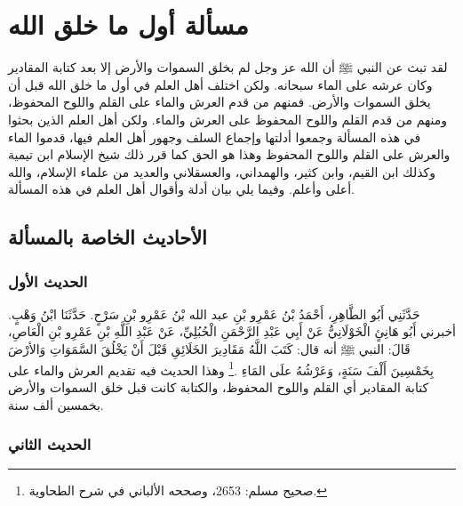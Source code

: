 \section{مسألة أول ما خلق الله}
\label{sec:app_first_creation}


لقد تبث عن النبي ﷺ أن الله عز وجل لم بخلق السموات والأرض إلا بعد كتابة المقادير وكان عرشه على الماء سبحانه. ولكن اختلف أهل العلم في أول ما خلق الله قبل أن يخلق السموات والأرض. فمنهم من قدم العرش والماء على القلم واللوح المحفوظ، ومنهم من قدم القلم واللوح المحفوظ على العرش والماء. ولكن أهل العلم الذين بحثوا في هذه المسألة وجمعوا أدلتها وإجماع السلف وجهور أهل العلم فيها، قدموا الماء والعرش على القلم واللوح المحفوظ وهذا هو الحق كما قرر ذلك شيخ الإسلام ابن تيمية وكذلك ابن القيم، وابن كثير، والهمداني، والعسقلاني والعديد من علماء الإسلام، والله أعلى وأعلم. وفيما يلي بيان أدلة وأقوال أهل العلم في هذه المسألة.

\subsection{الأحاديث الخاصة بالمسألة}

\subsubsection{الحديث الأول}
\label{sec:app_first_creation_hadith_1}

حَدَّثَنِي أَبُو الطَّاهِرِ، أَحْمَدُ بْنُ عَمْرِو بْنِ عبد الله بْنُ عَمْرِو بْنِ سَرْحٍ. حَدَّثَنَا ابْنُ وَهْبٍ. أخبرني أَبُو هَانِئٍ الْخَوْلَانِيُّ عَنْ أَبِي عَبْدِ الرَّحْمَنِ الْحُبُلِيِّ، عَنْ عَبْدِ اللَّهِ بْنِ عَمْرِو بْنِ الْعَاصِ، قَالَ: النبي ﷺ أنه قال:  كَتَبَ اللَّهُ مَقَادِيرَ الخَلَائِقِ قَبْلَ أَنْ يَخْلُقَ السَّمَوَاتِ وَالأرْضَ بِخَمْسِينَ أَلْفَ سَنَةٍ، وَعَرْشُهُ علَى المَاءِ \href{https://shamela.ws/book/1727/6683#p2}{\faExternalLink} \cite{muslim}.\footnote{صحيح مسلم: 2653، وصححه الألباني في شرح الطحاوية.} وهذا الحديث فيه تقديم العرش والماء على كتابة المقادير أي القلم واللوح المحفوظ، والكتابة كانت قبل خلق السموات والأرض بخمسين ألف سنة.

\subsubsection{الحديث الثاني}
\label{sec:app_first_creation_hadith_2}

